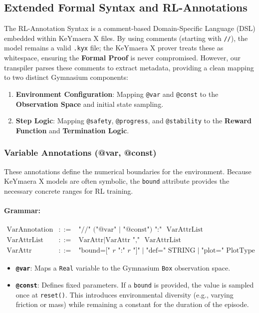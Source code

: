 \documentclass{article}
\begin{document}
\subsection{Extended Formal Syntax and RL-Annotations}

The RL-Annotation Syntax is a comment-based Domain-Specific Language (DSL) embedded within KeYmaera X files. By using comments (starting with \texttt{//}), the model remains a valid \texttt{.kyx} file; the KeYmaera X prover treats these as whitespace, ensuring the \textbf{Formal Proof} is never compromised. However, our transpiler parses these comments to extract metadata, providing a clean mapping to two distinct Gymnasium components:
\begin{enumerate}
    \item \textbf{Environment Configuration}: Mapping \texttt{@var} and \texttt{@const} to the \textbf{Observation Space} and initial state sampling.
    \item \textbf{Step Logic}: Mapping \texttt{@safety}, \texttt{@progress}, and \texttt{@stability} to the \textbf{Reward Function} and \textbf{Termination Logic}.
\end{enumerate}

\subsubsection{Variable Annotations (@var, @const)}
These annotations define the numerical boundaries for the environment. Because KeYmaera X models are often symbolic, the \texttt{bound} attribute provides the necessary concrete ranges for RL training.

\paragraph{Grammar:}
\[
\begin{array}{lcl}
\text{VarAnnotation} & ::= & \text{"//"} \text{ ("@var" } \mid \text{ "@const")} \text{ ":" } \text{ VarAttrList} \\
\text{VarAttrList}   & ::= & \text{VarAttr} \mid \text{VarAttr} \text{ "," } \text{ VarAttrList} \\
\text{VarAttr}       & ::= & \text{"bound=[" } r \text{ ":" } r \text{ "]"} \mid \text{"def=" } \text{STRING} \mid \text{"plot=" } \text{PlotType}
\end{array}
\]

\begin{itemize}
    \item \textbf{\texttt{@var}}: Maps a \texttt{Real} variable to the Gymnasium \texttt{Box} observation space.
    \item \textbf{\texttt{@const}}: Defines fixed parameters. If a \texttt{bound} is provided, the value is sampled once at \texttt{reset()}. This introduces environmental diversity (e.g., varying friction or mass) while remaining a constant for the duration of the episode.
\end{itemize}
\end{document}
